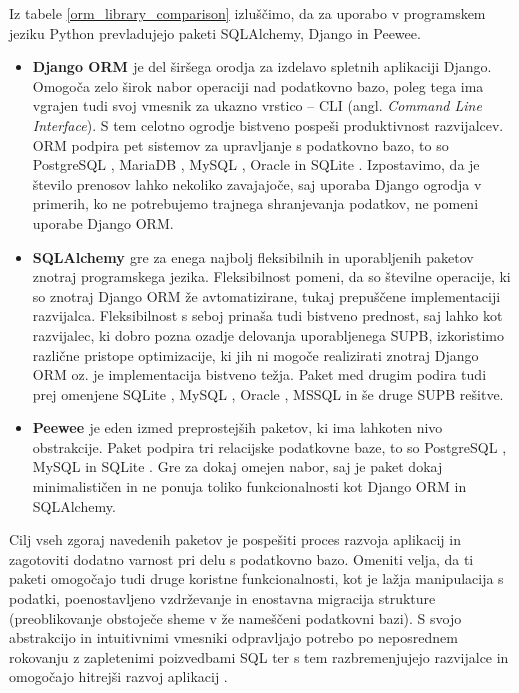 \documentclass[a4paper,12pt,openright]{book}
\begin{document}
    \noindent
    Iz tabele \ref{orm_library_comparison} izluščimo, da za uporabo v programskem jeziku Python prevladujejo paketi SQLAlchemy, Django in Peewee.
    \begin{itemize}
        \item \textbf{Django ORM \cite{DJANGO_GITHUB}} je del širšega orodja za izdelavo spletnih aplikaciji Django. Omogoča zelo širok nabor operaciji nad podatkovno bazo, poleg tega ima vgrajen tudi svoj vmesnik za ukazno vrstico – CLI (angl. \textit{Command Line Interface}). S tem celotno ogrodje bistveno pospeši produktivnost razvijalcev. ORM podpira pet sistemov za upravljanje s podatkovno bazo, to so PostgreSQL \cite{POSTGRESQL}, MariaDB \cite{MARIADB}, MySQL \cite{MYSQL}, Oracle \cite{ORACLE} in SQLite \cite{SQLITE}. Izpostavimo, da je število prenosov lahko nekoliko zavajajoče, saj uporaba Django ogrodja v primerih, ko ne potrebujemo trajnega shranjevanja podatkov, ne pomeni uporabe Django ORM.
        \item \textbf{SQLAlchemy \cite{SQLALCHEMY_GITHUB}} gre za enega najbolj fleksibilnih in uporabljenih paketov znotraj programskega jezika. Fleksibilnost pomeni, da so številne operacije, ki so znotraj Django ORM že avtomatizirane, tukaj prepuščene implementaciji razvijalca. Fleksibilnost s seboj prinaša tudi bistveno prednost, saj lahko kot razvijalec, ki dobro pozna ozadje delovanja uporabljenega SUPB, izkoristimo različne pristope optimizacije, ki jih ni mogoče realizirati znotraj Django ORM oz. je implementacija bistveno težja. Paket med drugim podira tudi prej omenjene SQLite \cite{SQLITE}, MySQL \cite{MYSQL}, Oracle \cite{ORACLE}, MSSQL \cite{MSSQL} in še druge SUPB rešitve.
        \item \textbf{Peewee \cite{PEEWEE_GITHUB}} je eden izmed preprostejših paketov, ki ima lahkoten nivo obstrakcije. Paket podpira tri relacijske podatkovne baze, to so PostgreSQL \cite{POSTGRESQL}, MySQL \cite{MYSQL} in SQLite \cite{SQLITE}. Gre za dokaj omejen nabor, saj je paket dokaj minimalističen in ne ponuja toliko funkcionalnosti kot Django ORM in SQLAlchemy.
    \end{itemize}

    \noindent
    Cilj vseh zgoraj navedenih paketov je pospešiti proces razvoja aplikacij in zagotoviti dodatno varnost pri delu s podatkovno bazo. Omeniti velja, da ti paketi omogočajo tudi druge koristne funkcionalnosti, kot je lažja manipulacija s podatki, poenostavljeno vzdrževanje in enostavna migracija strukture (preoblikovanje obstoječe sheme v že nameščeni podatkovni bazi). S svojo abstrakcijo in intuitivnimi vmesniki odpravljajo potrebo po neposrednem rokovanju z zapletenimi poizvedbami SQL ter s tem razbremenjujejo razvijalce in omogočajo hitrejši razvoj aplikacij \cite{torres-17}.
\end{document}
